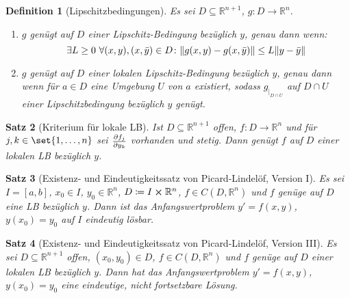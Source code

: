 \documentclass[a4paper]{article}
\newcounter{Sec}
\theoremstyle{marginbreak}
\newtheorem{definition}{Definition}[Sec]
\newtheorem{satz}[definition]{Satz}
\begin{document}
	\begin{definition}[Lipschitzbedingungen]
		Es sei $D\subseteq\mathbb{R}^{n+1}$, $g\colon D\to\mathbb{R}^n$.
		\begin{enumerate}[label=(\alph*)]
			\item $g$ genügt auf $D$ einer Lipschitz-Bedingung bezüglich $y$,
				genau dann wenn:
				\[
					\exists L\geq 0\ \forall (x, y), (x, \bar{y})\in D
					\colon \norm{g(x, y) - g(x, \bar{y})} \leq L\norm{y - \bar{y}}
				\]
			\item $g$ genügt auf $D$ einer lokalen Lipschitz-Bedingung bezüglich $y$, genau
				dann wenn für $a\in D$ eine Umgebung $U$ von $a$ existiert, sodass $g_{\vert_{D\cap U}}$
				auf $D\cap U$ einer Lipschitzbedingung bezüglich $y$ genügt.
		\end{enumerate}
	\end{definition}
	\begin{satz}[Kriterium für lokale LB]
		Ist $D\subseteq\mathbb{R}^{n+1}$ offen, $f\colon D\to\mathbb{R}^n$ und für
		$j, k\in\set{1,\ldots,n}$ sei $\pdv{f_j}{y_k}$ vorhanden und stetig. Dann genügt
		$f$ auf $D$ einer lokalen LB bezüglich $y$.
	\end{satz}
	\begin{satz}[Existenz- und Eindeutigkeitssatz von Picard-Lindelöf, Version I]
		Es sei $I = \left[a, b\right]$, $x_0\in I$, $y_0\in\mathbb{R}^n$, $D\coloneqq I\cross\mathbb{R}^n$,
		$f\in C(D,\mathbb{R}^n)$ und $f$ genüge auf $D$ eine LB bezüglich $y$. Dann ist das Anfangswertproblem
		$y'=f(x, y)$, $y(x_0)=y_0$ auf $I$ eindeutig lösbar.
	\end{satz}
	\begin{satz}[Existenz- und Eindeutigkeitssatz von Picard-Lindelöf, Version III]
		Es sei $D\subseteq\mathbb{R}^{n+1}$ offen, $(x_0, y_0)\in D$, $f\in C(D, \mathbb{R}^n)$
		und $f$ genüge auf $D$ einer lokalen LB bezüglich $y$. Dann hat das Anfangswertproblem
		$y'=f(x, y)$, $y(x_0) = y_0$ eine eindeutige, nicht fortsetzbare Lösung.
	\end{satz}
\end{document}
